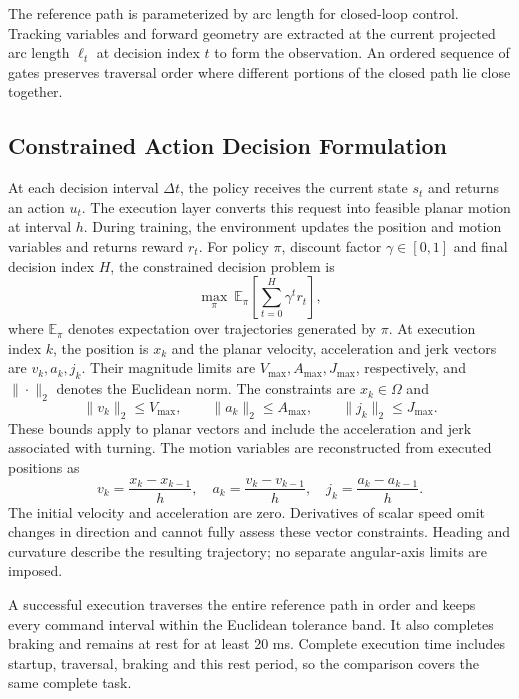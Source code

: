 \documentclass[preprint,12pt]{elsarticle}
\begin{document}
The reference path is parameterized by arc length for closed-loop control. Tracking variables and forward geometry are extracted at the current projected arc length $\ell_t$ at decision index $t$ to form the observation. An ordered sequence of gates preserves traversal order where different portions of the closed path lie close together.

\subsection{Constrained Action Decision Formulation}
At each decision interval $\Delta t$, the policy receives the current state $s_t$ and returns an action $u_t$. The execution layer converts this request into feasible planar motion at interval $h$. During training, the environment updates the position and motion variables and returns reward $r_t$. For policy $\pi$, discount factor $\gamma\in[0,1]$ and final decision index $H$, the constrained decision problem is
\begin{equation}
\max_{\pi}\ \mathbb{E}_{\pi}\!\left[\sum_{t=0}^{H}\gamma^t r_t\right],
\end{equation}
where $\mathbb{E}_{\pi}$ denotes expectation over trajectories generated by $\pi$. At execution index $k$, the position is $x_k$ and the planar velocity, acceleration and jerk vectors are $v_k,a_k,j_k$. Their magnitude limits are $V_{\max},A_{\max},J_{\max}$, respectively, and $\|\cdot\|_2$ denotes the Euclidean norm. The constraints are $x_k\in\Omega$ and
\begin{equation}
\|v_k\|_2\leq V_{\max},\qquad \|a_k\|_2\leq A_{\max},\qquad \|j_k\|_2\leq J_{\max}.
\end{equation}
These bounds apply to planar vectors and include the acceleration and jerk associated with turning. The motion variables are reconstructed from executed positions as
\begin{equation}
v_k=\frac{x_k-x_{k-1}}{h},\quad a_k=\frac{v_k-v_{k-1}}{h},\quad j_k=\frac{a_k-a_{k-1}}{h}.
\label{eq:physical_differences}
\end{equation}
The initial velocity and acceleration are zero. Derivatives of scalar speed omit changes in direction and cannot fully assess these vector constraints. Heading and curvature describe the resulting trajectory; no separate angular-axis limits are imposed.

A successful execution traverses the entire reference path in order and keeps every command interval within the Euclidean tolerance band. It also completes braking and remains at rest for at least 20 ms. Complete execution time includes startup, traversal, braking and this rest period, so the comparison covers the same complete task.
\end{document}
